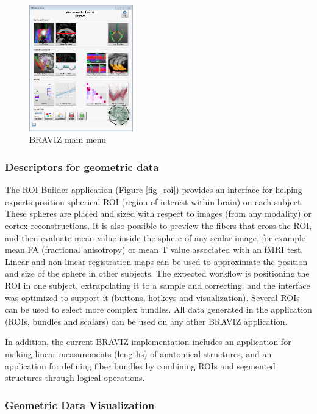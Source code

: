 \documentclass[twocolumn]{svjour3}
\begin{document}
\begin{figure}
\begin{center}
\includegraphics[width=0.4\textwidth]{figures/braviz_menu.PNG}
\end{center}
 \caption{\label{fig_menu} BRAVIZ main menu }
\end{figure}


\subsubsection{Descriptors for geometric data}

The ROI Builder application (Figure \ref{fig_roi}) provides an interface for helping experts position spherical ROI  (region of interest within brain) on each subject. These spheres are placed and sized with respect to images (from any modality) or cortex reconstructions. It is also possible to preview the fibers that cross the ROI, and then evaluate mean value inside the sphere of any scalar image, for example mean FA (fractional anisotropy) or mean T value associated with an fMRI test. 
Linear and non-linear registration maps can be used to approximate the position and size of the sphere in other subjects. The expected workflow is positioning the ROI in one subject, extrapolating it to a sample and correcting; and the interface was optimized to support it (buttons, hotkeys and visualization). Several ROIs can be used to select more complex bundles. All data generated in the application (ROIs, bundles and scalars) can be used on any other BRAVIZ application. 

In addition, the current BRAVIZ implementation includes an application for making linear measurements (lengths) of anatomical structures, and an application for defining fiber bundles by combining ROIs and segmented structures through logical operations.


\subsubsection{Geometric Data Visualization}
\end{document}
